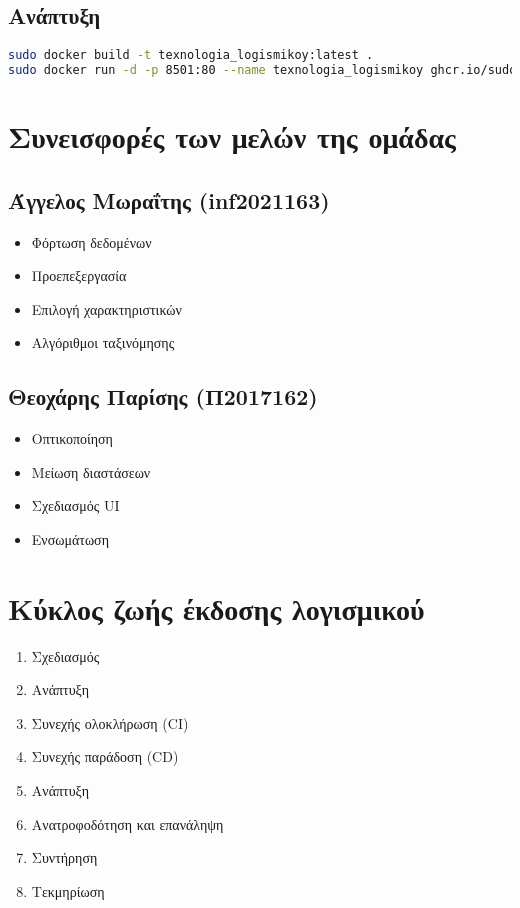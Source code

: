 \documentclass{article}
\begin{document}
\subsection{Ανάπτυξη}
\begin{lstlisting}[language=bash]
sudo docker build -t texnologia_logismikoy:latest .
sudo docker run -d -p 8501:80 --name texnologia_logismikoy ghcr.io/sudo455/texnologia_logismikoy:latest
\end{lstlisting}

\section{Συνεισφορές των μελών της ομάδας}

\subsection{Άγγελος Μωραΐτης (inf2021163)}
\begin{itemize}
    \item Φόρτωση δεδομένων
    \item Προεπεξεργασία
    \item Επιλογή χαρακτηριστικών
    \item Αλγόριθμοι ταξινόμησης
\end{itemize}

\subsection{Θεοχάρης Παρίσης (Π2017162)}
\begin{itemize}
    \item Οπτικοποίηση
    \item Μείωση διαστάσεων
    \item Σχεδιασμός UI
    \item Ενσωμάτωση
\end{itemize}

\section{Κύκλος ζωής έκδοσης λογισμικού}

\begin{enumerate}
    \item Σχεδιασμός
    \item Ανάπτυξη
    \item Συνεχής ολοκλήρωση (CI)
    \item Συνεχής παράδοση (CD)
    \item Ανάπτυξη
    \item Ανατροφοδότηση και επανάληψη
    \item Συντήρηση
    \item Τεκμηρίωση
\end{enumerate}
\end{document}
